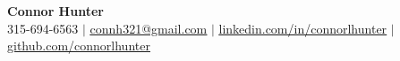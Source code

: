\begin{center}
    \textbf{\Huge Connor Hunter} \\ \vspace{1pt}
    \small 315-694-6563 \quad $|$ \quad
    \href{mailto:connh321@gmail.com}{\underline{connh321@gmail.com}} \quad $|$ \quad
    \href{https://www.linkedin.com/in/connorlhunter}{\underline{linkedin.com/in/connorlhunter}} \quad $|$ \quad
    \href{https://github.com/connorlhunter}{\underline{github.com/connorlhunter}}
\end{center}
